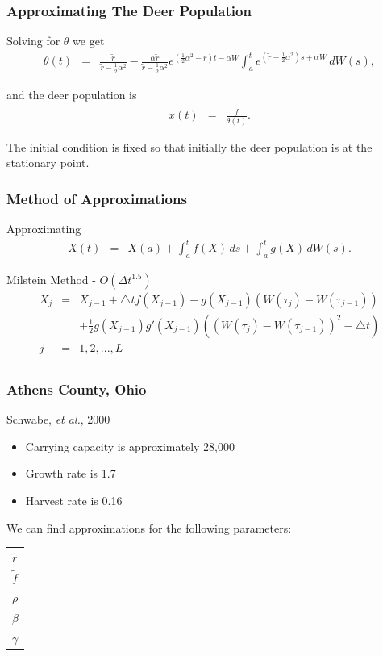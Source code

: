 \documentclass{beamer}   %
\newcommand{\lp}{\left(}
\newcommand{\rp}{\right)}
\newcommand{\half}{\frac{1}{2}}
\begin{document}
\begin{frame}
  \frametitle{Approximating The Deer Population}

  Solving for $\theta$ we get
  \begin{eqnarray*}
    \theta(t) & = & \frac{\tilde{r}}{\tilde{r}-\half\alpha^2} -
    \frac{\alpha \tilde{r}}{\tilde{r}-\half \alpha^2} 
    e^{\lp\half \alpha^2 - r\rp t - \alpha W } 
    \int^t_a e^{\lp \tilde{r}-\half\alpha^2\rp s + \alpha W} \, dW(s),
  \end{eqnarray*}

  and the deer population is 
  \begin{eqnarray*}
    x(t) & = & \frac{\tilde{f}}{\theta(t)}.
  \end{eqnarray*}

  The initial condition is fixed so that initially the deer population
  is at the stationary point.
  
\end{frame}

\begin{frame}
  \frametitle{Method of Approximations}

  Approximating
  \begin{eqnarray*}
    X(t) & = & X(a) + \int^t_a f(X) \, ds + \int^t_a g(X) \, dW(s).
  \end{eqnarray*}

  Milstein Method - $O(\Delta t^{1.5})$
  \begin{eqnarray*}
    X_{j} &=& X_{j-1} + \triangle tf(X_{j-1}) + g(X_{j-1})(W(\tau_{j})-W(\tau_{j-1}
    ))      \nonumber\\ 
    && + \frac{1}{2} g(X_{j-1})g'(X_{j-1})((W(\tau_{j})-W(\tau_{j-1}))^{2}-\triangle t)\\
    j &=& 1,2,... ,L \\
  \end{eqnarray*}

  
\end{frame}

\begin{frame}
  \frametitle{Athens County, Ohio}
  Schwabe, \emph{et al.}, 2000
  \begin{itemize}
  \item Carrying capacity is approximately 28,000
  \item Growth rate is 1.7
  \item Harvest rate is 0.16
  \end{itemize}

  We can find approximations for the following parameters: \\
  \begin{tabular}{l}
    $\tilde{r}$ \\
    $\tilde{f}$ \\
    $\rho$ \\
    $\beta$ \\
    $\gamma$
  \end{tabular}

\end{frame}
\end{document}
